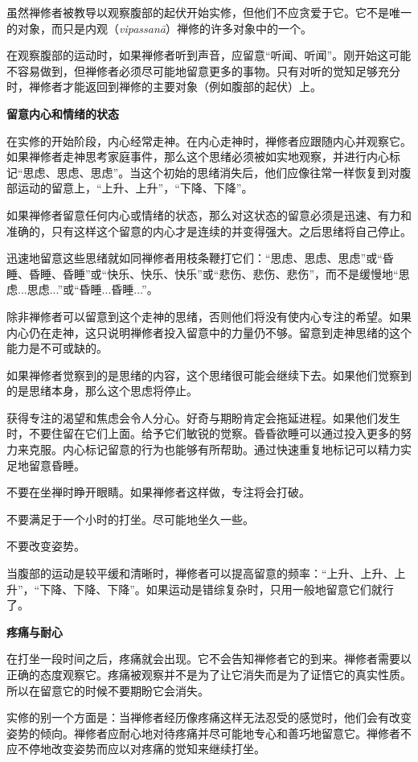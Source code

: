 虽然禅修者被教导以观察腹部的起伏开始实修，但他们不应贪爱于它。它不是唯一的对象，而只是内观（{\it vipassan\=a}）禅修的许多对象中的一个。

在观察腹部的运动时，如果禅修者听到声音，应留意“听闻、听闻”。刚开始这可能不容易做到，但禅修者必须尽可能地留意更多的事物。只有对听的觉知足够充分时，禅修者才能返回到禅修的主要对象（例如腹部的起伏）上。

{\medbreak\bf 留意内心和情绪的状态\smallbreak}

在实修的开始阶段，内心经常走神。在内心走神时，禅修者应跟随内心并观察它。如果禅修者走神思考家庭事件，那么这个思绪必须被如实地观察，并进行内心标记“思虑、思虑、思虑”。当这个初始的思绪消失后，他们应\1像往常一样恢复到对腹部运动的留意上，“上升、上升”，“下降、下降”。

如果禅修者留意任何内心或情绪的状态，那么对这状态的留意必须是迅速、有力和准确的，只有这样这个留意的内心才是连续的并变得强大。之后思绪将自己停止。

迅速地留意这些思绪就如同禅修者用枝条鞭打它们：“思虑、思虑、思虑”或“昏睡、昏睡、昏睡”或“快乐、快乐、快乐”或“悲伤、悲伤、悲伤”，而不是缓慢地“思虑...思虑...”或“昏睡...昏睡...”。

除非禅修者可以留意到这个走神的思绪，否则他们将没有使内心专注的希望。如果内心仍在走神，这只说明禅修者投入留意中的力量仍不够。留意到走神思绪的这个能力是不可或缺的。

如果禅修者觉察到的是思绪的内容，这个思绪很可能会继续下去。如果他们觉察到的是思绪本身，那么这个思虑将停止。

获得专注的渴望和焦虑会令人分心。好奇与期盼肯定会拖延进程。如果他们发生时，不要住留在它们上面。给予它们敏锐的觉察。昏昏欲睡可以通过投入更多的努力来克服。内心标记留意的行为也能够有所帮助。通过快速重复地标记可以精力实足地留意昏睡。

不要在坐禅时睁开眼睛。如果禅修者这样做，专注将会打破。

不要满足于一个小时的打坐。尽可能地坐久一些。

\1不要改变姿势。

当腹部的运动是较平缓和清晰时，禅修者可以提高留意的频率：“上升、上升、上升”，“下降、下降、下降”。如果运动是错综复杂时，只用一般地留意它们就行了。

{\medbreak\bf 疼痛与耐心\smallbreak}

在打坐一段时间之后，疼痛就会出现。它不会告知禅修者它的到来。禅修者需要以正确的态度观察它。疼痛被观察并不是为了让它消失而是为了证悟它的真实性质。所以在留意它的时候不要期盼它会消失。

实修的别一个方面是：当禅修者经历像疼痛这样无法忍受的感觉时，他们会有改变姿势的倾向。禅修者应耐心地对待疼痛并尽可能地专心和善巧地留意它。禅修者不应不停地改变姿势而应以对疼痛的觉知来继续打坐。

